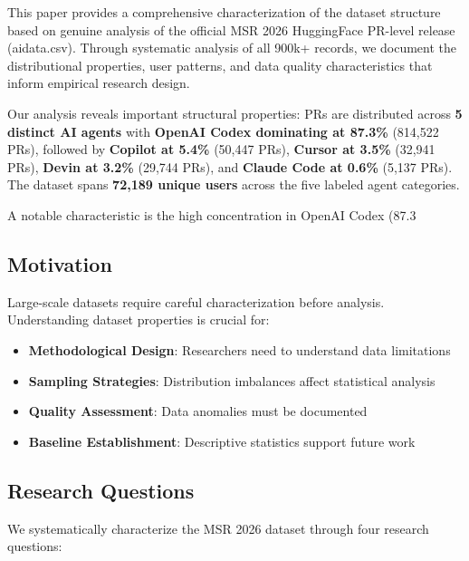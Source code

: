 \documentclass[conference]{IEEEtran}
\begin{document}
This paper provides a comprehensive characterization of the dataset structure based on genuine analysis of the official MSR 2026 HuggingFace PR-level release (aidata.csv). Through systematic analysis of all 900k+ records, we document the distributional properties, user patterns, and data quality characteristics that inform empirical research design.

Our analysis reveals important structural properties: PRs are distributed across \textbf{5 distinct AI agents} with \textbf{OpenAI Codex dominating at 87.3\%} (814,522 PRs), followed by \textbf{Copilot at 5.4\%} (50,447 PRs), \textbf{Cursor at 3.5\%} (32,941 PRs), \textbf{Devin at 3.2\%} (29,744 PRs), and \textbf{Claude Code at 0.6\%} (5,137 PRs). The dataset spans \textbf{72,189 unique users} across the five labeled agent categories. 

A notable characteristic is the high concentration in OpenAI Codex (87.3%

\subsection{Motivation}

Large-scale datasets require careful characterization before analysis. Understanding dataset properties is crucial for:
\begin{itemize}
    \item \textbf{Methodological Design}: Researchers need to understand data limitations
    \item \textbf{Sampling Strategies}: Distribution imbalances affect statistical analysis
    \item \textbf{Quality Assessment}: Data anomalies must be documented
    \item \textbf{Baseline Establishment}: Descriptive statistics support future work
\end{itemize}

\subsection{Research Questions}

We systematically characterize the MSR 2026 dataset through four research questions:
\end{document}
